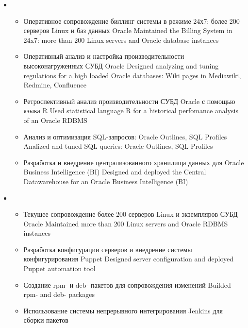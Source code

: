 \documentclass[11pt,a4paper,sans]{moderncv}        %
\begin{document}
{\begin{itemize}
\begin{itemize}
				{Designed a fault tolerance strategy for the Billing System: Oracle standby, Oracle DataGuard, Oracle GoldenGate}
		\end{itemize}
	\item {}
		\begin{itemize}
			\item {}
				{Оперативное сопровождение биллинг системы в режиме 24х7: более 200 серверов Linux и баз данных Oracle}
				{Maintained the Billing System in 24x7: more than 200 Linux servers and Oracle database instances}
			\item {}
				{Оперативный анализ и настройка производительности высоконагруженных СУБД Oracle}
				{Designed analyzing and tuning regulations for a high loaded Oracle databases: Wiki pages in Mediawiki, Redmine, Confluence}
			\item {}
				{Ретроспективный анализ производительности СУБД Oracle с помощью языка R}
				{Used statistical language R for a historical perfomance analysis of an Oracle RDBMS}
			\item {}
				{Анализ и оптимизация SQL-запросов: Oracle Outlines, SQL Profiles}
				{Analized and tuned SQL queries: Oracle Outlines, SQL Profiles}
			\item {}
				{Разработка и внедрение централизованного хранилища данных для Oracle Business Intelligence (BI)}
				{Designed and deployed the Central Datawarehouse for an Oracle Business Intelligence (BI)}
		\end{itemize}
	\item {}
		\begin{itemize}
			\item {}
				{Текущее сопровождение более 200 серверов Linux и экземпляров СУБД Oracle}
				{Maintained more than 200 Linux servers and Oracle RDBMS instances}
			\item {}
				{Разработка конфигурации серверов и внедрение системы конфигурирования Puppet}
				{Designed server configuration and deployed Puppet automation tool}
			\item {}
				{Создание rpm- и deb- пакетов для сопровождения изменений}
				{Builded rpm- and deb- packages}
			\item {}
				{Использование системы непрерывного интегрирования Jenkins для сборки пакетов}

\end{itemize}
\end{itemize}}
\end{document}
